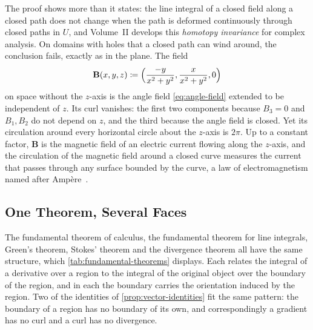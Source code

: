 The proof shows more than it states: the line integral of a closed field along a closed path does not change when the path is deformed continuously through closed paths in $U$, and Volume~II develops this \emph{homotopy invariance} for complex analysis. On domains with holes that a closed path can wind around, the conclusion fails, exactly as in the plane. The field
\[
\mathbf B(x,y,z)\coloneqq\Bigl(\frac{-y}{x^2+y^2},\frac x{x^2+y^2},0\Bigr)
\]
on space without the $z$-axis is the angle field \eqref{eq:angle-field} extended to be independent of $z$. Its curl vanishes: the first two components because $B_3=0$ and $B_1,B_2$ do not depend on $z$, and the third because the angle field is closed. Yet its circulation around every horizontal circle about the $z$-axis is $2\pi$. Up to a constant factor, $\mathbf B$ is the magnetic field of an electric current flowing along the $z$-axis, and the circulation of the magnetic field around a closed curve measures the current that passes through any surface bounded by the curve, a law of electromagnetism named after Amp\`ere~\cite{marsden2012vector}.

\subsection{One Theorem, Several Faces}

The fundamental theorem of calculus, the fundamental theorem for line integrals, Green's theorem, Stokes' theorem and the divergence theorem all have the same structure, which \cref{tab:fundamental-theorems} displays. Each relates the integral of a derivative over a region to the integral of the original object over the boundary of the region, and in each the boundary carries the orientation induced by the region. Two of the identities of \cref{prop:vector-identities} fit the same pattern: the boundary of a region has no boundary of its own, and correspondingly a gradient has no curl and a curl has no divergence.

